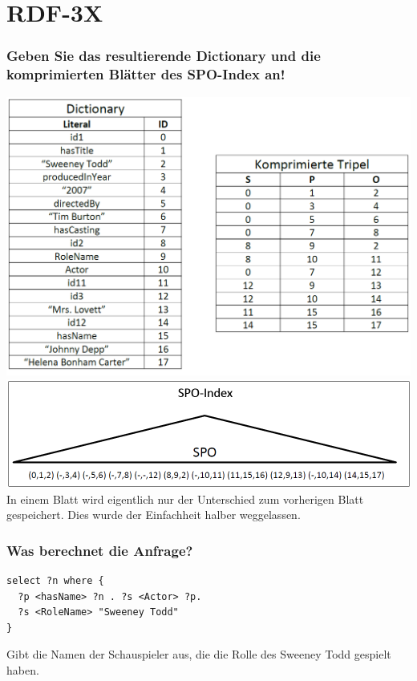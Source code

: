 \documentclass[11pt,a4paper]{scrartcl}
\begin{document}
\section{RDF-3X}
\subsubsection*{Geben Sie das resultierende Dictionary und die komprimierten Blätter des SPO-Index an!}
\includegraphics[width=\textwidth]{triple.png}
\includegraphics[width=\textwidth]{baum.png}
In einem Blatt wird eigentlich nur der Unterschied zum vorherigen Blatt gespeichert. Dies wurde der Einfachheit halber weggelassen.

\subsubsection*{Was berechnet die Anfrage?}
\begin{verbatim}
select ?n where {
  ?p <hasName> ?n . ?s <Actor> ?p.
  ?s <RoleName> "Sweeney Todd"
}
\end{verbatim}
Gibt die Namen der Schauspieler aus, die die Rolle des Sweeney Todd gespielt haben.
\end{document}
